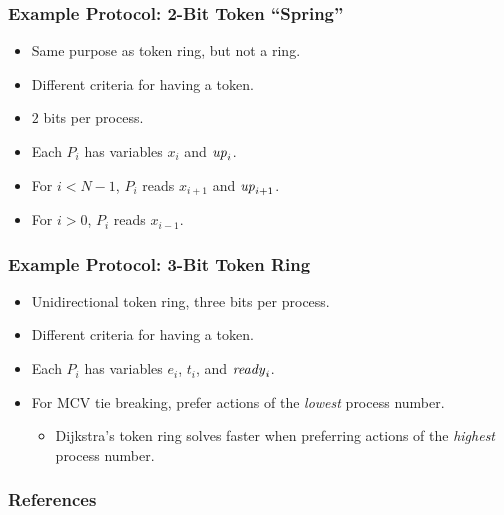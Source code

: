 \documentclass[handout]{beamer}
\begin{document}
\begin{frame}
\frametitle{Example Protocol: 2-Bit Token ``Spring'' \cite{dij}}
\begin{itemize}
\item Same purpose as token ring, but not a ring.
\item Different criteria for having a token.
\item $2$ bits per process.
\item Each $P_i$ has variables $x_i$ and $\mathit{up}_i$.
\item For $i<N-1$, $P_i$ reads $x_{i+1}$ and $\mathit{up}_{i+1}$.
\item For $i>0$, $P_i$ reads $x_{i-1}$.
\end{itemize}
\begin{figure}
\end{figure}
\end{frame}

\begin{frame}
\frametitle{Example Protocol: 3-Bit Token Ring \cite{Gouda:3bitTR}}
\begin{itemize}
\item Unidirectional token ring, three bits per process.
\item Different criteria for having a token.
\item Each $P_i$ has variables $e_i$, $t_i$, and $\mathit{ready}_i$.
\item For MCV tie breaking, prefer actions of the {\it lowest} process number.
 \begin{itemize}
 \item Dijkstra's token ring solves faster when preferring actions of the {\it highest} process number.
 \end{itemize}
\end{itemize}
\end{frame}

\begin{frame}[allowframebreaks]
\frametitle{References}


\end{frame}
\end{document}
